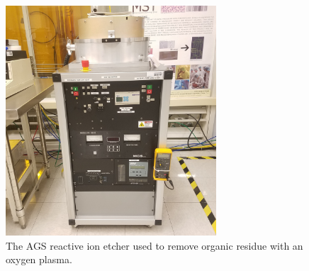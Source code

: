\begin{figure}[h]
    \centering
    \includegraphics[width=0.7\textwidth]{images/AGS_RIE.jpg}
    \caption[AGS reactive ion etcher]{The AGS reactive ion etcher used to remove organic residue with an oxygen plasma.}
    \label{fig:AGS-RIE}
\end{figure}

